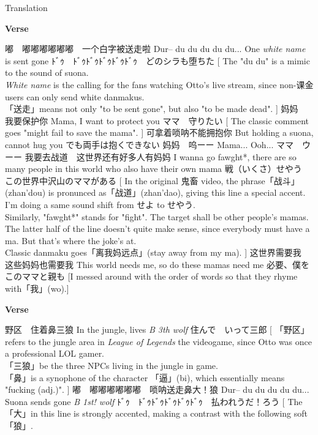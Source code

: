 \documentclass{ctexart}
\newenvironment{lverse}
	{
		\par
		\textbf{\LARGE Verse}
		\vspace{.5em}
		\par
	}
	{
		\par
	}
\begin{document}
\begin{section}{Translation}
\begin{lverse}
		\lline
			{嘟　嘟嘟嘟嘟嘟嘟　一个白字被送走啦}
			{Dur-- du du du du du... One \textit{white name} is sent gone}
			{ﾄﾞｩ　ﾄﾞｩﾄﾞｩﾄﾞｩﾄﾞｩﾄﾞｩ　どのシラも堕ちた}
			[
				The "du du" is a mimic to the sound of suona. \\
				\textit{White name} is the calling for the fans watching Otto's live stream, since non-课金 users can only send white danmakus. \\
				「送走」means not only "to be sent gone", but also "to be made dead".
			]
		\lline
			{妈妈　我要保护你}
			{Mama, I want to protect you}
			{ママ　守りたい}
			[
				The classic comment goes "might fail to save the mama".
			]
		\lline
			{可拿着唢呐不能拥抱你}
			{But holding a suona, cannot hug you}
			{でも両手は抱くできない}
		\lline
			{妈妈　呜ーー}
			{Mama... Ooh...}
			{ママ　ウーー}
		\lline
			{我要去战道　这世界还有好多人有妈妈}
			{I wanna go fawght*, there are so many people in this world who also have their own mama}
			{戦（いくさ）せやう　この世界中沢山のママがある}
			[
				In the original 鬼畜 video, the phrase「战斗」(zhan'dou) is pronunced as「战道」(zhan'dao), giving this line a special accent.
				I'm doing a same sound shift from せよ to せやう. \\
				Similarly, "fawght*" stands for "fight".
				The target shall be other people's mamas. \\
				The latter half of the line doesn't quite make sense, since everybody must have a ma.
				But that's where the joke's at. \\
				Classic danmaku goes「离我妈远点」(stay away from my ma).
			]
		\lline
			{这世界需要我　这些妈妈也需要我}
			{This world needs me, so do these mamas need me}
			{必要、僕を　このママと親も}
			[I messed around with the order of words so that they rhyme with「我」(wo).]
	\end{lverse}
	\begin{lverse}
		\lline
			{野区　住着鼻三狼}
			{In the jungle, lives \textit{B 3th wolf}}
			{住んで　いって三郎}
			[
				「野区」refers to the jungle area in \textit{League of Legends} the videogame, since Otto was once a professional LOL gamer. \\
				「三狼」be the three NPCs living in the jungle in game. \\
				「鼻」is a synophone of the character 「逼」(bi), which essentially means "fucking (adj.)".
			]
		\lline
			{嘟　嘟嘟嘟嘟嘟嘟　唢呐送走鼻大！狼}
			{Dur-- du du du du du... Suona sends gone \textit{B 1st! wolf}}
			{ﾄﾞｩ　ﾄﾞｩﾄﾞｩﾄﾞｩﾄﾞｩﾄﾞｩ　払われうだ！ろう}
			[
				The「大」in this line is strongly accented, making a contrast with the following soft「狼」.

\end{lverse}
\end{section}
\end{document}
